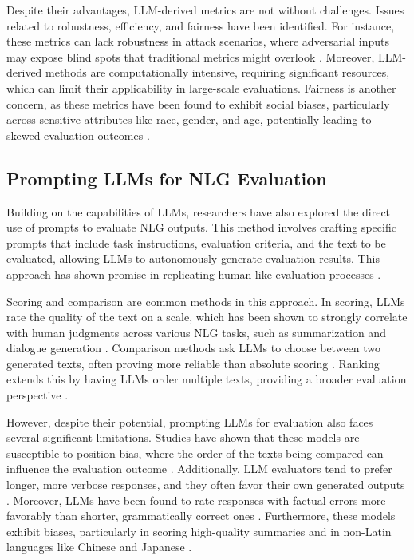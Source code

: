 Despite their advantages, LLM-derived metrics are not without challenges. Issues related to robustness, efficiency, and fairness have been identified. For instance, these metrics can lack robustness in attack scenarios, where adversarial inputs may expose blind spots that traditional metrics might overlook \cite{he2022blind}. Moreover, LLM-derived methods are computationally intensive, requiring significant resources, which can limit their applicability in large-scale evaluations. Fairness is another concern, as these metrics have been found to exhibit social biases, particularly across sensitive attributes like race, gender, and age, potentially leading to skewed evaluation outcomes \cite{sun2022bertscore}.

\subsection{Prompting LLMs for NLG Evaluation}

Building on the capabilities of LLMs, researchers have also explored the direct use of prompts to evaluate NLG outputs. This method involves crafting specific prompts that include task instructions, evaluation criteria, and the text to be evaluated, allowing LLMs to autonomously generate evaluation results. This approach has shown promise in replicating human-like evaluation processes \cite{gao2024llm}.

Scoring and comparison are common methods in this approach. In scoring, LLMs rate the quality of the text on a scale, which has been shown to strongly correlate with human judgments across various NLG tasks, such as summarization and dialogue generation \cite{chiang2023can}. Comparison methods ask LLMs to choose between two generated texts, often proving more reliable than absolute scoring \cite{luo2023chatgpt}. Ranking extends this by having LLMs order multiple texts, providing a broader evaluation perspective \cite{ji2023exploring}.

However, despite their potential, prompting LLMs for evaluation also faces several significant limitations. Studies have shown that these models are susceptible to position bias, where the order of the texts being compared can influence the evaluation outcome \cite{wang2023large}. Additionally, LLM evaluators tend to prefer longer, more verbose responses, and they often favor their own generated outputs \cite{zheng2024judging, liu2023g}. Moreover, LLMs have been found to rate responses with factual errors more favorably than shorter, grammatically correct ones \cite{wu2023style}. Furthermore, these models exhibit biases, particularly in scoring high-quality summaries and in non-Latin languages like Chinese and Japanese \cite{hada2023large}.

